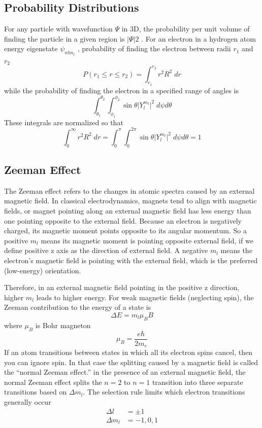 \documentclass[../../../main.tex]{subfiles}
\begin{document}
\subsection{Probability Distributions}
For any particle with wavefunction $\Psi$ in 3D, the probability per unit volume of finding the particle in a given region is $|\Psi|2$ . For an electron in a hydrogen atom energy eigenstate $\psi_{nlm_l}$ , probability of finding the electron between radii $r_1$ and $r_2$
\begin{equation*}
    P(r_1 \leq r \leq r_2)= \int_{r_1}^{r_2}r^2R^2\;dr
\end{equation*}
while the probability of finding the electron in a specified range of angles is
\begin{equation*}
    \int_{\theta_1}^{\theta_2}\int_{\phi_1}^{\phi_2} \sin\theta \big| Y_l^{m_l}\big|^2\;d\psi d\theta
\end{equation*}
These integrals are normalized so that
\begin{equation*}
    \int_{0}^{\infty}r^2R^2\;dr = \int_{0}^{\pi}\int_{0}^{2\pi} \sin\theta \big| Y_l^{m_l}\big|^2\;d\psi d\theta =1
\end{equation*}

\subsection{Zeeman Effect} 
The Zeeman effect refers to the changes in atomic spectra caused by an external magnetic field. In classical electrodynamics, magnets tend to align with magnetic fields, or magnet pointing along an external magnetic field has less energy than one pointing opposite to the external field. Because an electron is negatively charged, its magnetic moment points opposite to its angular momentum. So a positive $m_l$ means its magnetic moment is pointing opposite external field, if we define positive z axis as the direction of external field. A negative $m_l$ means the electron's magnetic field is pointing with the external field, which is the preferred (low-energy) orientation.

Therefore, in an external magnetic field pointing in the positive z direction, higher $m_l$ leads to higher energy. For weak magnetic fields (neglecting spin), the Zeeman contribution to the energy of a state is
\begin{equation*}
    \Delta E=m_l\mu_BB
\end{equation*}
where $\mu_B$ is Bohr magneton
\begin{equation*}
    \mu_B=\frac{e\hbar}{2m_e}
\end{equation*}
If an atom transitions between states in which all its electron spins cancel, then you can ignore spin. In that case the splitting caused by a magnetic field is called the “normal Zeeman effect.” in the presence of an external magnetic field, the normal Zeeman effect splits the $n = 2$ to $n = 1$ transition into three separate transitions based on $\Delta m_l$. The selection rule limits which electron transitions generally occur
\begin{align*}
    \Delta l&=\pm 1\\
    \Delta m_l&=-1,0,1
\end{align*}
\end{document}
